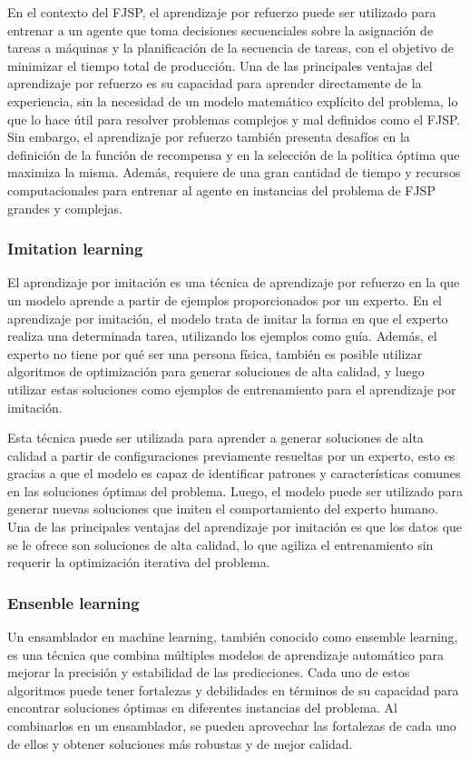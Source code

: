 En el contexto del FJSP, el aprendizaje por refuerzo puede ser utilizado para entrenar a un 
agente que toma decisiones secuenciales sobre la asignación de tareas a máquinas y la 
planificación de la secuencia de tareas, con el objetivo de minimizar el tiempo total de producción. 
Una de las principales ventajas del aprendizaje por refuerzo es su capacidad para aprender directamente 
de la experiencia, sin la necesidad de un modelo matemático explícito del problema, lo que lo hace 
útil para resolver problemas complejos y mal definidos como el FJSP. Sin embargo, el aprendizaje 
por refuerzo también presenta desafíos en la definición de la función de recompensa y en la 
selección de la política óptima que maximiza la misma. Además, requiere de una gran cantidad de tiempo 
y recursos computacionales para entrenar al agente en instancias del problema de FJSP grandes y complejas.

\subsubsection{Imitation learning}
El aprendizaje por imitación es una técnica de aprendizaje por refuerzo en la que un modelo aprende
a partir de ejemplos proporcionados por un experto. En el aprendizaje por imitación, el modelo trata
de imitar la forma en que el experto realiza una determinada tarea, utilizando los ejemplos como guía.
Además, el experto no tiene por qué ser una persona física, también es posible utilizar algoritmos de
optimización para generar soluciones de alta calidad, y luego utilizar estas soluciones como ejemplos
de entrenamiento para el aprendizaje por imitación.\medskip

Esta técnica puede ser utilizada para aprender a generar soluciones de alta calidad a partir de 
configuraciones previamente resueltas por un experto, esto es gracias a que el modelo es capaz de 
identificar patrones y características comunes en las soluciones óptimas del problema. Luego, el 
modelo puede ser utilizado para generar nuevas soluciones que imiten el comportamiento del experto 
humano. Una de las principales ventajas del aprendizaje por imitación es que los datos que se le 
ofrece son soluciones de alta calidad, lo que agiliza el entrenamiento sin requerir la optimización 
iterativa del problema. 

\subsubsection{Ensenble learning}
Un ensamblador en machine learning, también conocido como ensemble learning, es una técnica que 
combina múltiples modelos de aprendizaje automático para mejorar la precisión y estabilidad de 
las predicciones. Cada uno de estos algoritmos puede tener fortalezas y debilidades en términos 
de su capacidad para encontrar soluciones óptimas en diferentes instancias del problema. Al 
combinarlos en un ensamblador, se pueden aprovechar las fortalezas de cada uno de ellos y obtener
soluciones más robustas y de mejor calidad.\medskip

